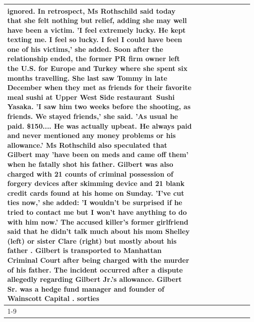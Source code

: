 \begin{table}[H]
\begin{tabular}{lllrlllll}
ignored. In retrospect, Ms Rothschild said today that she felt nothing but relief, adding she may well have been a victim. 'I feel extremely lucky. He kept texting me. I feel so lucky. I feel I could have been one of his victims,' she added. Soon after the relationship ended, the former PR firm owner left the U.S. for Europe and Turkey where she spent six months  travelling. She last saw Tommy in late December when they met as friends for their favorite meal sushi at Upper West Side restaurant Sushi Yasaka. 'I saw him two weeks before the shooting, as friends. We stayed friends,' she said. 'As usual he paid. \$150.... He was actually upbeat. He always paid and never mentioned any money problems or his allowance.' Ms Rothschild also speculated that Gilbert may 'have been on meds and came off them' when he fatally shot his father. Gilbert was also charged with 21 counts of criminal possession of forgery devices after skimming device and 21 blank credit cards found at his home on Sunday. 'I've cut ties now,' she added: 'I wouldn’t be surprised if he tried to contact me but I won’t have anything to do with him now.' The accused killer's former girlfriend said that he didn't talk much about his mom Shelley (left) or sister Clare (right) but mostly about his father . Gilbert is transported to Manhattan Criminal Court  after being charged with the murder of his father. The incident occurred after a dispute allegedly regarding Gilbert Jr.'s allowance. Gilbert Sr. was a hedge fund manager and founder of Wainscott Capital . sorties \\
\cline{1-9}

\end{tabular}
\end{table}
